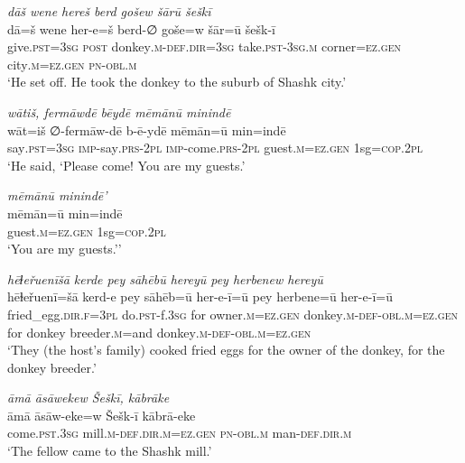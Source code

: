 \ea \label{HB.48}
\textit{dāš wene hereš berd gošew šārū šeškī} \\ 
\gll dā=š wene her-e=š berd-∅ goše=w šār=ū šešk-ī \\ 
 give\textsc{.pst}\textsc{=3sg} \textsc{post} donkey\textsc{.m}\textsc{-def}\textsc{.dir}\textsc{=3sg} take\textsc{.pst}\textsc{-3sg}\textsc{.m} corner\textsc{=ez}\textsc{.gen} city\textsc{.m}\textsc{=ez}\textsc{.gen} \textsc{pn}\textsc{-obl}\textsc{.m} \\ 
\glt `He set off. He took the donkey to the suburb of Shashk city.'
\z 
 
\ea \label{HB.51}
\textit{wātiš, fermāwdē bēydē mēmānū minindē} \\ 
\gll wāt=iš ∅-fermāw-dē b-ē-ydē mēmān=ū min=indē \\ 
 say\textsc{.pst}\textsc{=3sg} \textsc{imp-}say\textsc{.prs}\textsc{-2pl} \textsc{imp-}come\textsc{.prs}\textsc{-2pl} guest\textsc{.m}\textsc{=ez}\textsc{.gen} 1sg\textsc{=cop}\textsc{.2pl} \\ 
\glt `He said, ‘Please come! You are my guests.'
\z 
 
\ea \label{HB.52}
\textit{mēmānū minindē'} \\ 
\gll mēmān=ū min=indē \\ 
 guest\textsc{.m}\textsc{=ez}\textsc{.gen} 1sg\textsc{=cop}\textsc{.2pl} \\ 
\glt `You are my guests.’'
\z 
 
\ea \label{HB.56}
\textit{hēɫeřuenīšā kerde pey sāhēbū hereyū pey herbenew hereyū} \\ 
\gll hēɫeřuenī=šā kerd-e pey sāhēb=ū her-e-ī=ū pey herbene=ū her-e-ī=ū \\ 
 fried\_egg\textsc{.dir}\textsc{\textsc{.f}}\textsc{=3pl} do\textsc{.pst}-f\textsc{.3sg} for owner\textsc{.m}\textsc{=ez}\textsc{.gen} donkey\textsc{.m}\textsc{-def}\textsc{-obl}\textsc{.m}\textsc{=ez}\textsc{.gen} for donkey breeder\textsc{.m}=and donkey\textsc{.m}\textsc{-def}\textsc{-obl}\textsc{.m}\textsc{=ez}\textsc{.gen} \\ 
\glt `They (the host’s family) cooked fried eggs for the owner of the donkey, for the donkey breeder.'
\z 
 
\ea \label{HB.60}
\textit{āmā āsāwekew Šeškī, kābrāke} \\ 
\gll āmā āsāw-eke=w Šešk-ī kābrā-eke \\ 
 come\textsc{.pst}\textsc{.3sg} mill\textsc{.m}\textsc{-def}\textsc{.dir}\textsc{.m}\textsc{=ez}\textsc{.gen} \textsc{pn}\textsc{-obl}\textsc{.m} man\textsc{-def}\textsc{.dir}\textsc{.m} \\ 
\glt `The fellow came to the Shashk mill.'
\z 
 
